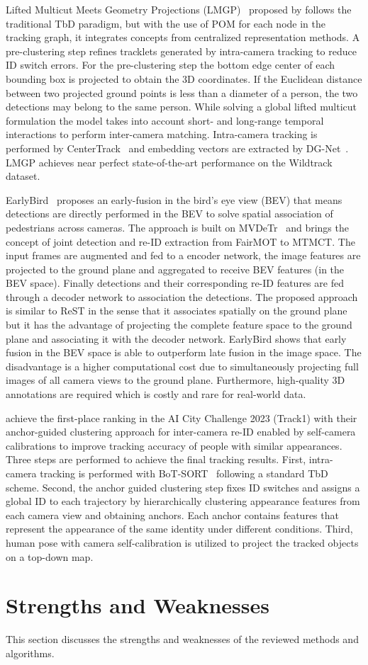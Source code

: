 Lifted Multicut Meets Geometry Projections (LMGP)~\cite{Nguyen22a} proposed by \citeauthor{Nguyen22a} follows the traditional TbD paradigm, but with the use of POM for each node in the tracking graph, it integrates concepts from centralized representation methods. A pre-clustering step refines tracklets generated by intra-camera tracking to reduce ID switch errors. For the pre-clustering step the bottom edge center of each bounding box is projected to obtain the 3D coordinates. If the Euclidean distance between two projected ground points is less than a diameter of a person, the two detections may belong to the same person. While solving a global lifted multicut formulation the model takes into account short- and long-range temporal interactions  to perform inter-camera matching. Intra-camera tracking is performed by CenterTrack~\cite{Zhou20} and embedding vectors are extracted by DG-Net~\cite{Zheng19}. LMGP achieves near perfect state-of-the-art performance on the Wildtrack dataset.

EarlyBird~\cite{Teepe23} proposes an early-fusion in the bird's eye view (BEV) that means detections are directly performed in the BEV to solve spatial association of pedestrians across cameras. The approach is built on MVDeTr~\cite{Hou21} and brings the concept of joint detection and re-ID extraction from FairMOT to MTMCT. The input frames are augmented and fed to a encoder network, the image features are projected to the ground plane and aggregated to receive BEV features (in the BEV space). Finally detections and their corresponding re-ID features are fed through a decoder network to association the detections. The proposed approach is similar to ReST in the sense that it associates spatially on the ground plane but it has the advantage of projecting the complete feature space to the ground plane and associating it with the decoder network. EarlyBird shows that early fusion in the BEV space is able to outperform late fusion in the image space. The disadvantage is a higher computational cost due to simultaneously projecting full images of all camera views to the ground plane. Furthermore, high-quality 3D annotations are required which is costly and rare for real-world data.

\textcite{Huang23b} achieve the first-place ranking in the AI City Challenge 2023 (Track1) with their anchor-guided clustering approach for inter-camera re-ID enabled by self-camera calibrations to improve tracking accuracy of people with similar appearances. Three steps are performed to achieve the final tracking results. First, intra-camera tracking is performed with BoT-SORT~\cite{Aharon22} following a standard TbD scheme. Second, the anchor guided clustering step fixes ID switches and assigns a global ID to each trajectory by hierarchically clustering appearance features from each camera view and obtaining anchors. Each anchor contains features that represent the appearance of the same identity under different conditions. Third, human pose with camera self-calibration is utilized to project the tracked objects on a top-down map.

\section{Strengths and Weaknesses}\label{sec:strengths_and_weaknesses}
This section discusses the strengths and weaknesses of the reviewed methods and algorithms.

